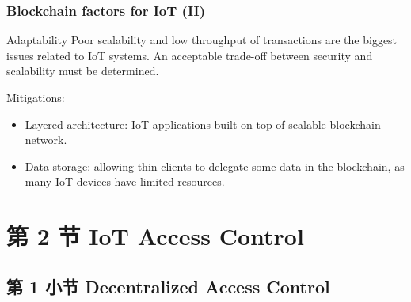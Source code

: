 \documentclass[
    aspectratio=169,                   %
]{beamer}
\begin{document}
    \begin{frame}
        \frametitle{Blockchain factors for IoT (II)}

        \begin{block}{Adaptability}
            Poor scalability and low throughput of transactions are the biggest issues related to IoT systems. An acceptable trade-off between security and scalability must be determined.\cite{conoscenti}
        \end{block}

        Mitigations:
        \begin{itemize}
            \item \alert{Layered architecture}: IoT applications built on top of scalable blockchain network.
            \item \alert{Data storage}: allowing thin clients to delegate some data in the blockchain, as many IoT devices have limited resources.\cite{Axon2015PrivacyawarenessIB}
        \end{itemize}

    \end{frame}


        

\section{第 2 节 IoT Access Control}

\subsection{第 1 小节 Decentralized Access Control}
\end{document}
